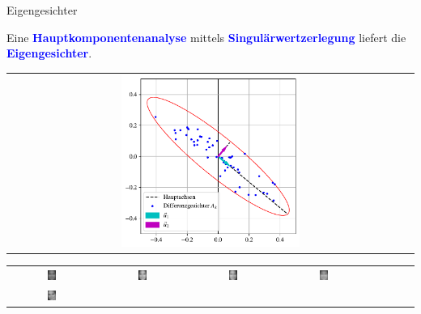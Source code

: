 \documentclass[10pt,aspectratio=169]{beamer}
\begin{document}
\begin{frame}[fragile]{Eigengesichter}
	\begin{center}
		Eine \textcolor{blue}{\textbf{Hauptkomponentenanalyse}} mittels \textcolor{blue}{\textbf{Singulärwertzerlegung}} liefert die \textcolor{blue}{\textbf{Eigengesichter}}.
	\end{center}
	\begin{tabular}{c}
		\includegraphics[width=0.45\textwidth]{images/facespace/principal_components}
	\end{tabular}
	\pause
	\begin{tabular}{cccccccc}
		\includegraphics[width=0.095\textwidth]{images/eigenfaces/eigenface00} & \includegraphics[width=0.095\textwidth]{images/eigenfaces/eigenface01} &
		\includegraphics[width=0.095\textwidth]{images/eigenfaces/eigenface02} & \includegraphics[width=0.095\textwidth]{images/eigenfaces/eigenface03} \\
		\includegraphics[width=0.095\textwidth]{images/eigenfaces/eigenface04} &

\end{tabular}
\end{frame}
\end{document}
